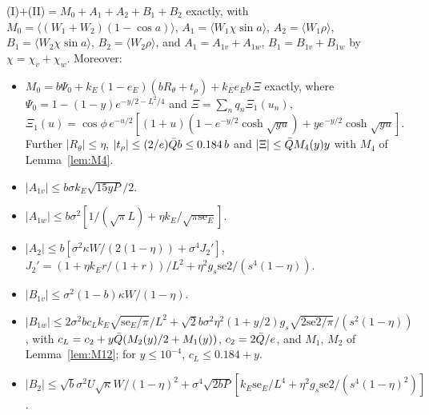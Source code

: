 \begin{lemma} 
\label{lem:CZ2}
(I)$+$(II)$=M_0+A_1+A_2+B_1+B_2$ exactly, with $M_0=\langle(W_1+W_2)(1-\cos a)\rangle$, $A_1=\langle W_1\chi\sin a\rangle$, $A_2=\langle W_1\rho\rangle$, $B_1=\langle W_2\chi\sin a\rangle$, $B_2=\langle W_2\rho\rangle$, and $A_1=A_{1v}+A_{1w}$, $B_1=B_{1v}+B_{1w}$ by $\chi=\chi_v+\chi_w$. Moreover:
\begin{itemize}
\item[(M0)] $M_0=b\Psi_0+k_E(1-e_E)(bR_\theta+t_\rho)+k_Ee_Eb\,\Xi$ exactly, where $\Psi_0=1-(1-y)e^{-y/2-L^2/4}$ and $\Xi=\sum_nq_n\Xi_1(u_n)$,
$\Xi_1(u)=\cos\phi\,e^{-u/2}[(1+u)(1-e^{-y/2}\cosh\sqrt{yu})+ye^{-y/2}\cosh\sqrt{yu}]$.
Further $|R_\theta|\le\eta$, $|t_\rho|\le(2/e)\bar Q b\le0.184\,b$ and $|\Xi|\le\bar Q M_4(y)y$ with $M_4$ of Lemma~\ref{lem:M4}.
\item[(A1v)] $|A_{1v}|\le b\sigma k_E\sqrt{15yP}/2$.
\item[(A1w)] $|A_{1w}|\le b\sigma^2[1/(\sqrt\pi L)+\eta k_E/\sqrt{\pi\mathrm{se}_E}]$.
\item[(A2)] $|A_2|\le b[\sigma^2\kappa W/(2(1-\eta))+\sigma^4J_2']$, $J_2'=(1+\eta k_Er/(1+r))/L^2+\eta^2g_s\mathrm{se2}/(s^4(1-\eta))$.
\item[(B1v)] $|B_{1v}|\le\sigma^2(1-b)\kappa W/(1-\eta)$.
\item[(B1w)] $|B_{1w}|\le2\sigma^2bc_Lk_E\sqrt{\mathrm{se}_E/\pi}/L^2+\sqrt2b\sigma^2\eta^2(1+y/2)g_s\sqrt{2\mathrm{se2}/\pi}/(s^2(1-\eta))$, with $c_L=c_2+y\bar Q(M_2(y)/2+M_1(y))$, $c_2=2\bar Q/e$, and $M_1$, $M_2$ of Lemma~\ref{lem:M12}; for $y\le10^{-4}$, $c_L\le0.184+y$.
\item[(B2)] $|B_2|\le\sqrt b\sigma^2U\sqrt\kappa W/(1-\eta)^2+\sigma^4\sqrt{2bP}[k_E\mathrm{se}_E/L^4+\eta^2g_s\mathrm{se2}/(s^4(1-\eta)^2)]$.
\end{itemize}
\end{lemma}

